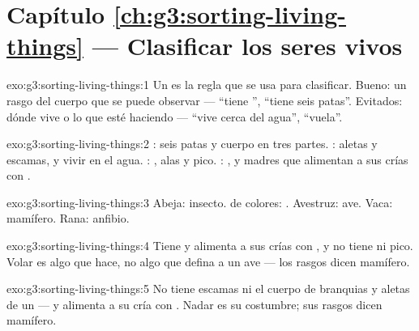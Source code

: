 \section*{Capítulo \ref{ch:g3:sorting-living-things} --- Clasificar los seres vivos}

\begin{solution}{exo:g3:sorting-living-things:1}
Un  es la regla que se usa para clasificar. Bueno: un rasgo
del cuerpo que se puede observar --- ``tiene '', ``tiene seis
patas''. Evitados: dónde vive o lo que esté haciendo --- ``vive cerca
del agua'', ``vuela''.
\end{solution}

\begin{solution}{exo:g3:sorting-living-things:2}
: seis patas y cuerpo en tres partes. : aletas y escamas,
y vivir en el agua. : , alas y pico. : , y
madres que alimentan a sus crías con .
\end{solution}

\begin{solution}{exo:g3:sorting-living-things:3}
Abeja: insecto.  de colores: . Avestruz: ave. Vaca: mamífero.
Rana: anfibio.
\end{solution}

\begin{solution}{exo:g3:sorting-living-things:4}
Tiene  y alimenta a sus crías con , y no tiene  ni
pico. Volar es algo que hace, no algo que defina a un ave --- los
rasgos dicen mamífero.
\end{solution}

\begin{solution}{exo:g3:sorting-living-things:5}
No tiene escamas ni el cuerpo de branquias y aletas de un  --- y
alimenta a su cría con . Nadar es su costumbre; sus rasgos dicen
mamífero.
\end{solution}


